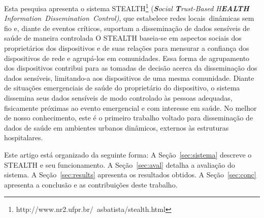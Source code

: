 \documentclass[12pt]{article}
\newcommand{\as}[1]{\textcolor{blue}{{\bf #1}}}
\begin{document}
Esta pesquisa apresenta o sistema \mbox{STEALTH}\footnote{http://www.nr2.ufpr.br/~asbatista/stealth.html} (\textit{\textbf{S}ocial \textbf{T}rust-Based H\textbf{EALTH} \mbox{Information Dissemination Control)}}, 
que %
estabelece 
redes locais~dinâmicas sem fio e,
diante de eventos críticos, suportam
a disseminação de dados sensíveis de saúde de maneira controlada
O \mbox{STEALTH} baseia-se em aspectos sociais dos proprietários dos dispositivos e de suas relações
para mensurar a confiança dos dispositivos de rede e agrupá-los em comunidades. Essa forma de agrupamento dos dispositivos contribui para as tomadas de decisão acerca da disseminação dos dados sensíveis, limitando-a aos dispositivos de uma mesma comunidade.
Diante
de situações emergenciais de saúde do proprietário do dispositivo, o sistema dissemina seus dados sensíveis de
modo 
controlado às pessoas adequadas,
fisicamente próximas ao evento emergencial e com interesse em saúde. No melhor de nosso conhecimento, este é o primeiro trabalho voltado para disseminação de dados de saúde em ambientes urbanos dinâmicos, externos às estruturas hospitalares. 





Este artigo está organizado da seguinte forma:
A Seção~\ref{sec:sistema} descreve o \mbox{STEALTH} e seu funcionamento. A Seção~\ref{sec:aval} detalha a avaliação do sistema. A Seção~\ref{sec:results} apresenta os resultados obtidos. A Seção~\ref{sec:conc} apresenta a conclusão e as contribuições deste trabalho.
\end{document}
